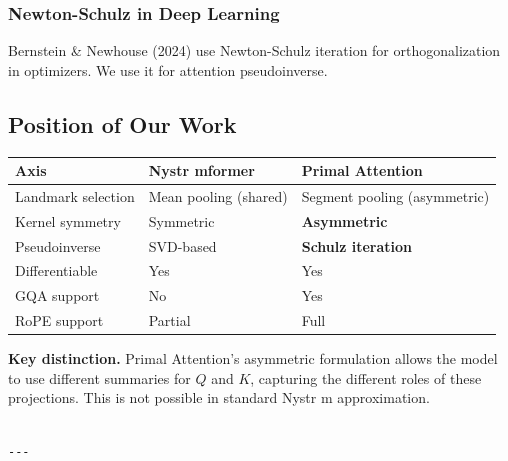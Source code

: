 \subsubsection{Newton-Schulz in Deep Learning}

Bernstein \& Newhouse (2024) use Newton-Schulz iteration for orthogonalization 
in optimizers. We use it for attention pseudoinverse.

\subsection{Position of Our Work}

\begin{table}[H]
\centering
\small
\begin{tabular}{lll}
\toprule
\textbf{Axis} & \textbf{Nystr mformer} & \textbf{Primal Attention} \\
\midrule
Landmark selection & Mean pooling (shared) & Segment pooling (asymmetric) \\
Kernel symmetry & Symmetric & \textbf{Asymmetric} \\
Pseudoinverse & SVD-based & \textbf{Schulz iteration} \\
Differentiable & Yes & Yes \\
GQA support & No & Yes \\
RoPE support & Partial & Full \\
\bottomrule
\end{tabular}
\end{table}

\textbf{Key distinction.} Primal Attention's asymmetric formulation allows the 
model to use different summaries for $Q$ and $K$, capturing the different 
roles of these projections. This is not possible in standard Nystr m 
approximation.
\begin{lstlisting}

---
\end{lstlisting}